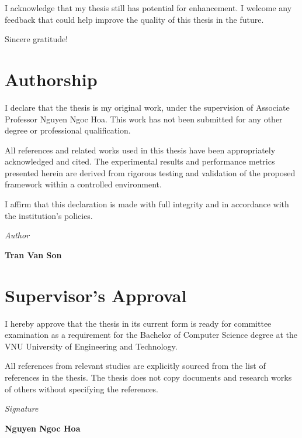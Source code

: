 \documentclass[12pt, a4paper, reqno, oneside]{book}
\begin{document}
I acknowledge that my thesis still has potential for enhancement. I welcome any feedback that could help improve the quality of this thesis in the future.

Sincere gratitude!


\newpage
\chapter*{Authorship}
\vspace{20pt}

I declare that the thesis is my original work, under the supervision of Associate Professor Nguyen Ngoc Hoa. This work has not been submitted for any other degree or professional qualification.

All references and related works used in this thesis have been appropriately acknowledged and cited. The experimental results and performance metrics presented herein are derived from rigorous testing and validation of the proposed framework within a controlled environment.

I affirm that this declaration is made with full integrity and in accordance with the institution's policies.

\begin{flushright}
{\it Author}
\hskip 1.5cm\quad


\vskip 2cm
{\bf Tran Van Son }  \quad\ 
\end{flushright}
\newpage



\newpage
\chapter*{Supervisor's Approval}
\vspace{20pt}
I hereby approve that the thesis in its current form is ready for committee examination as a requirement for the Bachelor of Computer Science degree at the VNU University of Engineering and Technology.

All references from relevant studies are explicitly sourced from the list of references in the thesis. The thesis does not copy documents and research works of others without specifying the references.


\begin{flushright}
{\it Signature}
\hskip 1.5cm\quad

\vskip 2cm
{\bf Nguyen Ngoc Hoa }  \quad\ 
\end{flushright}
\end{document}
